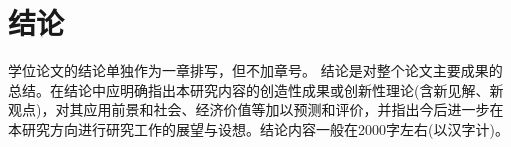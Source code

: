 

\chapter*{结\quad 论}

学位论文的结论单独作为一章排写，但不加章号。
结论是对整个论文主要成果的总结。在结论中应明确指出本研究内容的创造性成果或创新性理论(含新见解、新观点)，对其应用前景和社会、经济价值等加以预测和评价，并指出今后进一步在本研究方向进行研究工作的展望与设想。结论内容一般在2000字左右(以汉字计)。